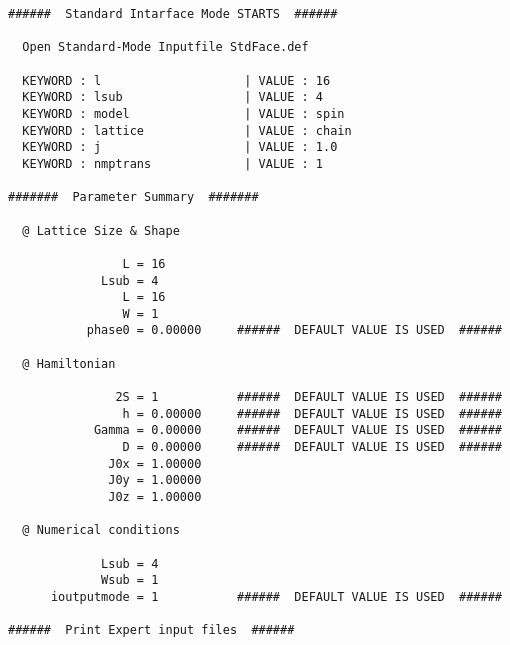 \begin{verbatim} 
######  Standard Intarface Mode STARTS  ######

  Open Standard-Mode Inputfile StdFace.def 

  KEYWORD : l                    | VALUE : 16 
  KEYWORD : lsub                 | VALUE : 4 
  KEYWORD : model                | VALUE : spin 
  KEYWORD : lattice              | VALUE : chain 
  KEYWORD : j                    | VALUE : 1.0 
  KEYWORD : nmptrans             | VALUE : 1 

#######  Parameter Summary  #######

  @ Lattice Size & Shape

                L = 16 
             Lsub = 4         
                L = 16        
                W = 1         
           phase0 = 0.00000     ######  DEFAULT VALUE IS USED  ######

  @ Hamiltonian 

               2S = 1           ######  DEFAULT VALUE IS USED  ######
                h = 0.00000     ######  DEFAULT VALUE IS USED  ######
            Gamma = 0.00000     ######  DEFAULT VALUE IS USED  ######
                D = 0.00000     ######  DEFAULT VALUE IS USED  ######
              J0x = 1.00000   
              J0y = 1.00000   
              J0z = 1.00000   

  @ Numerical conditions

             Lsub = 4         
             Wsub = 1         
      ioutputmode = 1           ######  DEFAULT VALUE IS USED  ######

######  Print Expert input files  ######


\end{verbatim}
